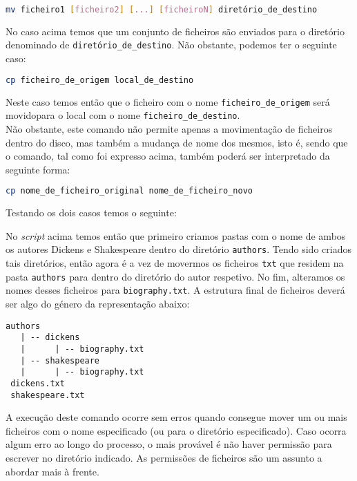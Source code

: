 \documentclass[a4paper, onecolumn, 10pt]{report}
\begin{document}
\begin{lstlisting}[language=bash, style=console]
mv ficheiro1 [ficheiro2] [...] [ficheiroN] diretório_de_destino
\end{lstlisting}

No caso acima temos que um conjunto de ficheiros são enviados para o diretório denominado de \texttt{diretório\_de\_destino}. Não obstante, podemos ter o seguinte caso:

\begin{lstlisting}[language=bash, style=console]
cp ficheiro_de_origem local_de_destino
\end{lstlisting}

Neste caso temos então que o ficheiro com o nome \texttt{ficheiro\_de\_origem} será movidopara o local com o nome \texttt{ficheiro\_de\_destino}. \\
Não obstante, este comando não permite apenas a movimentação de ficheiros dentro do disco, mas também a mudança de nome dos mesmos, isto é, sendo que o comando, tal como foi expresso acima, também poderá ser interpretado da seguinte forma:

\begin{lstlisting}[language=bash, style=console]
cp nome_de_ficheiro_original nome_de_ficheiro_novo
\end{lstlisting}

Testando os dois casos temos o seguinte:



No \textit{script} acima temos então que primeiro criamos pastas com o nome de ambos os autores Dickens e Shakespeare dentro do diretório \texttt{authors}. Tendo sido criados tais diretórios, então agora é a vez de movermos os ficheiros \texttt{txt} que residem na pasta \texttt{authors} para dentro do diretório do autor respetivo. No fim, alteramos os nomes desses ficheiros para \texttt{biography.txt}. A estrutura final de ficheiros deverá ser algo do género da representação abaixo:

\begin{lstlisting}[style=console]
 authors
   | -- dickens
   |      | -- biography.txt
   | -- shakespeare
   |      | -- biography.txt
 dickens.txt
 shakespeare.txt
\end{lstlisting}

A execução deste comando ocorre sem erros quando consegue mover um ou mais ficheiros com o nome especificado (ou para o diretório especificado). Caso ocorra algum erro ao longo do processo, o mais provável é não haver permissão para escrever no diretório indicado. As permissões de ficheiros são um assunto a abordar mais à frente. 
\end{document}
